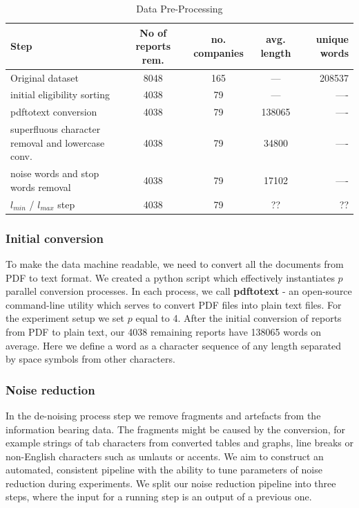 \documentclass[12pt,journal,letterpaper,oneside,onecolumn]{IEEEtran}
\begin{document}
\begin{table}[!ht]
  \begin{center}
    \caption{Data Pre-Processing}
    \begin{tabular}{l|c|c|c|r}
      \textbf{Step} & \textbf{No of reports rem.} & \textbf{no. companies} & \textbf{avg. length} & \textbf{unique words}\\
      \hline
      Original dataset & 8048 & 165 & --- &  208537 \\
      initial eligibility sorting & 4038 & 79 & --- & ---- \\
      pdftotext conversion & 4038 & 79 & 138065 & ---- \\
      superfluous character removal and lowercase conv. & 4038 & 79 & 34800 & ---- \\
      noise words and stop words removal & 4038 & 79 & 17102 & ---- \\
      $l_{min}$ / $l_{max}$ step & 4038 & 79 & ?? & ?? \\
    \end{tabular}
  \end{center}
\end{table}



\subsubsection{Initial conversion}
To make the data machine readable, we need to convert all the documents from PDF to text format. We created a python script which effectively instantiates $p$ parallel conversion processes. In each process, we call \textbf{pdftotext} - an open-source command-line utility which serves to convert PDF files into plain text files. For the experiment setup we set $p$ equal to 4. After the initial conversion of reports from PDF to plain text, our 4038 remaining reports have 138065 words on average. Here we define a word as a character sequence of any length separated by space symbols from other characters.

\subsubsection{Noise reduction}
In the de-noising process step we remove fragments and artefacts from the information bearing data.
The fragments might be caused by the conversion, for example strings of tab characters from converted tables and graphs, line breaks or non-English characters such as umlauts or accents.
We aim to construct an automated, consistent pipeline with the ability to tune parameters of noise reduction during experiments. We split our noise reduction pipeline into three steps, where the input for a running step is an output of a previous one.
\end{document}

